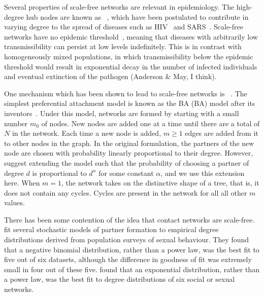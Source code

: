Several properties of scale-free networks are relevant in epidemiology.  The
high-degree hub nodes are known as
~\autocite{kemper1980identification}, which have been
postulated to contribute in varying degree to the spread of diseases such as
\gls{HIV}~\autocite{stadler2013uncovering} and
\gls{SARS}~\autocite{shen2004superspreading}. Scale-free networks have no
epidemic threshold~\autocite{pastor2001epidemic}, meaning that diseases with
arbitrarily low transmissibility can persist at low levels indefinitely. This
is in contrast with homogeneously mixed populations, in which transmissibility
below the epidemic threshold would result in exponential decay in the number of
infected individuals and eventual extinction of the pathogen (Anderson \& May,
I think). 

One mechanism which has been shown to lead to scale-free networks is
~\autocite{simon1955class,
barabasi1999emergence}. The simplest preferential attachment model is known as
the \acrlong{BA} (BA) model after its
inventors~\autocite{barabasi1999emergence}. Under this model, networks are
formed by starting with a small number $m_0$ of nodes. New nodes are added one
at a time until there are a total of $N$ in the network. Each time a new node
is added, $m \geq 1$ edges are added from it to other nodes in the graph. In
the original formulation, the partners of the new node are chosen with
probability linearly proportional to their degree. However,
\citeauthor{barabasi1999emergence} suggest extending the model such that the
probability of choosing a partner of degree $d$ is proportional to $d^\alpha$
for some constant $\alpha$, and we use this extension here. When $m = 1$, the
network takes on the distinctive shape of a tree, that is, it does not contain
any cycles. Cycles are present in the network for all all other $m$ values.

There has been some contention of the idea that contact networks are
scale-free. \textcite{handcock2004likelihood} fit several stochastic models of
partner formation to empirical degree distributions derived from population
surveys of sexual behaviour. They found that a negative binomial distribution,
rather than a power law, was the best fit to five out of six datasets, although
the difference in goodness of fit was extremely small in four out of these
five. \textcite{bansal2007individual} found that an exponential distribution,
rather than a power law, was the best fit to degree distributions of six social
or sexual networks. 

